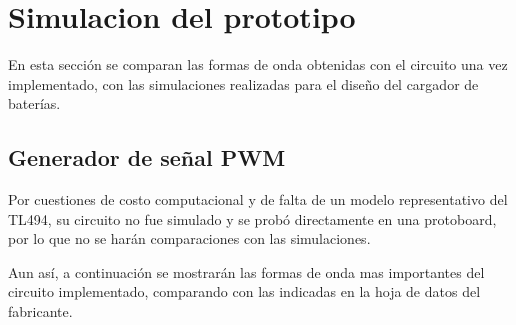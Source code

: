\section{Simulacion del prototipo}


En esta sección se comparan las formas de onda obtenidas con el circuito una vez implementado, con las simulaciones realizadas para el diseño del cargador de baterías.

\subsection{Generador de señal PWM}

Por cuestiones de costo computacional y de falta de un modelo representativo del TL494,
su circuito no fue simulado y se probó directamente en una protoboard,
por lo que no se harán comparaciones con las simulaciones.

Aun así, a continuación se mostrarán las formas de onda mas importantes del circuito implementado,
comparando con las indicadas en la hoja de datos del fabricante.

